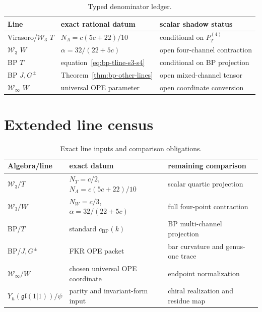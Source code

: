 \begin{table}[ht]
\centering
\caption{Typed denominator ledger.}
\label{tab:denominator-exponent-pattern}
\renewcommand{\arraystretch}{1.2}
\begin{tabular}{@{}l l l@{}}
\toprule
Line & exact rational datum & scalar shadow status \\
\midrule
Virasoro/$\mathcal W_3$ $T$ & $N_\Lambda=c(5c+22)/10$ & conditional on $P_T^{(4)}$ \\
$\mathcal W_3$ $W$ & $\alpha=32/(22+5c)$ & open four-channel contraction \\
BP $T$ & equation~\eqref{eq:bp-tline-s3-s4} & conditional on BP projection \\
BP $J,G^\pm$ & Theorem~\ref{thm:bp-other-lines} & open mixed-channel tensor \\
$\mathcal W_\infty$ $W$ & universal OPE parameter & open coordinate conversion \\
\bottomrule
\end{tabular}
\end{table}

\section{Extended line census}
\label{sec:extended-census-table}

\begin{table}[ht]
\centering
\caption{Exact line inputs and comparison obligations.}
\label{tab:extended-shadow-census}
\renewcommand{\arraystretch}{1.25}
\begin{tabular}{@{}l l p{5.2cm}@{}}
\toprule
Algebra/line & exact datum & remaining comparison \\
\midrule
$\mathcal W_3/T$ & $N_T=c/2$, $N_\Lambda=c(5c+22)/10$ & scalar quartic projection \\
$\mathcal W_3/W$ & $N_W=c/3$, $\alpha=32/(22+5c)$ & full four-point contraction \\
BP/$T$ & standard $c_{\mathrm{BP}}(k)$ & BP multi-channel projection \\
BP/$J,G^\pm$ & FKR OPE packet & bar curvature and genus-one trace \\
$\mathcal W_\infty/W$ & chosen universal OPE coordinate & endpoint normalization \\
$Y_\hbar(\mathfrak{gl}(1|1))/\psi$ & parity and invariant-form input & chiral realization and residue map \\
\bottomrule
\end{tabular}
\end{table}

